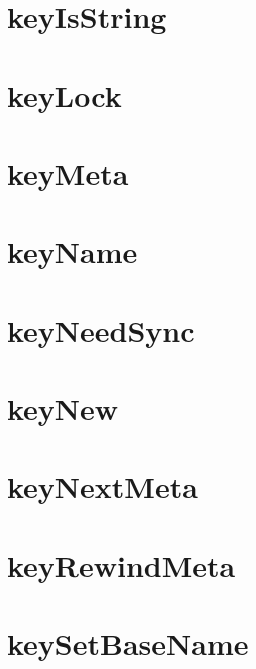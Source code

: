 \documentclass[twoside]{book}
\newcommand{\+}{\discretionary{\mbox{\scriptsize$\hookleftarrow$}}{}{}}
\begin{document}
\chapter{key\+Is\+String}
\label{doc_api_review_core_keyIsString_md}

\chapter{key\+Lock}
\label{doc_api_review_core_keyLock_md}

\chapter{key\+Meta}
\label{doc_api_review_core_keyMeta_md}

\chapter{key\+Name}
\label{doc_api_review_core_keyName_md}

\chapter{key\+Need\+Sync}
\label{doc_api_review_core_keyNeedSync_md}

\chapter{key\+New}
\label{doc_api_review_core_keyNew_md}

\chapter{key\+Next\+Meta}
\label{doc_api_review_core_keyNextMeta_md}

\chapter{key\+Rewind\+Meta}
\label{doc_api_review_core_keyRewindMeta_md}

\chapter{key\+Set\+Base\+Name}
\label{doc_api_review_core_keySetBaseName_md}

\end{document}
